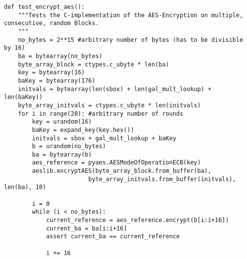 \begin{lstlisting}
def test_encrypt_aes():
    """Tests the C-implementation of the AES-Encryption on multiple, consecutive, random Blocks.
    """
    no_bytes = 2**15 #arbitrary number of bytes (has to be divisible by 16)
    ba = bytearray(no_bytes)
    byte_array_block = ctypes.c_ubyte * len(ba)
    key = bytearray(16)
    baKey = bytearray(176)
    initvals = bytearray(len(sbox) + len(gal_mult_lookup) + len(baKey))
    byte_array_initvals = ctypes.c_ubyte * len(initvals)
    for i in range(20): #arbitrary number of rounds
        key = urandom(16)
        baKey = expand_key(key.hex())
        initvals = sbox + gal_mult_lookup + baKey
        b = urandom(no_bytes)
        ba = bytearray(b)
        aes_reference = pyaes.AESModeOfOperationECB(key)
        aeslib.encryptAES(byte_array_block.from_buffer(ba),
                        byte_array_initvals.from_buffer(initvals), len(ba), 10)

        i = 0
        while (i < no_bytes):
            current_reference = aes_reference.encrypt(b[i:i+16])
            current_ba = ba[i:i+16]
            assert current_ba == current_reference

            i += 16
\end{lstlisting}
